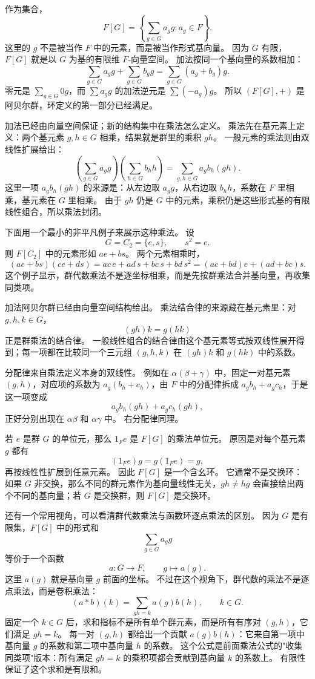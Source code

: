 作为集合，
\[
F[G]=\left\{\sum_{g\in G}a_g g:a_g\in F\right\}.
\]
这里的 $g$ 不是被当作 $F$ 中的元素，而是被当作形式基向量。
因为 $G$ 有限，$F[G]$ 就是以 $G$ 为基的有限维 $F$-向量空间。
加法按同一个基向量的系数相加：
\[
\sum_{g\in G}a_g g+\sum_{g\in G}b_g g
=\sum_{g\in G}(a_g+b_g)g.
\]
零元是 $\sum_{g\in G}0g$，而 $\sum a_g g$ 的加法逆元是 $\sum (-a_g)g$。
所以 $(F[G],+)$ 是阿贝尔群，环定义的第一部分已经满足。

加法已经由向量空间保证；新的结构集中在乘法怎么定义。
乘法先在基元素上定义：两个基元素 $g,h\in G$ 相乘，结果就是群里的乘积 $gh$。
一般元素的乘法则由双线性扩展给出：
\[
\left(\sum_{g\in G}a_g g\right)
\left(\sum_{h\in G}b_h h\right)
=
\sum_{g,h\in G}a_gb_h(gh).
\]
这里一项 $a_gb_h(gh)$ 的来源是：从左边取 $a_g g$，从右边取 $b_h h$，系数在 $F$ 里相乘，基元素在 $G$ 里相乘。
由于 $gh$ 仍是 $G$ 中的元素，乘积仍是这些形式基的有限线性组合，所以乘法封闭。

下面用一个最小的非平凡例子来展示这种乘法。
设
\[
G=C_2=\{e,s\},\qquad s^2=e.
\]
则 $F[C_2]$ 中的元素形如 $ae+bs$。
两个元素相乘时，
\[
(ae+bs)(ce+ds)
=ac\,e+ad\,s+bc\,s+bd\,s^2
=(ac+bd)e+(ad+bc)s.
\]
这个例子显示，群代数乘法不是逐坐标相乘，而是先按群乘法合并基向量，再收集同类项。

加法阿贝尔群已经由向量空间结构给出。
乘法结合律的来源藏在基元素里：对 $g,h,k\in G$，
\[
(gh)k=g(hk)
\]
正是群乘法的结合律。
一般线性组合的结合律由这个基元素等式按双线性展开得到；每一项都在比较同一个三元组 $(g,h,k)$ 在 $(gh)k$ 和 $g(hk)$ 中的系数。

分配律来自乘法定义本身的双线性。
例如在 $\alpha(\beta+\gamma)$ 中，固定一对基元素 $(g,h)$，对应项的系数为 $a_g(b_h+c_h)$，由 $F$ 中的分配律拆成 $a_gb_h+a_gc_h$，于是这一项变成
\[
a_gb_h(gh)+a_gc_h(gh),
\]
正好分别出现在 $\alpha\beta$ 和 $\alpha\gamma$ 中。
右分配律同理。

若 $e$ 是群 $G$ 的单位元，那么 $1_F e$ 是 $F[G]$ 的乘法单位元。
原因是对每个基元素 $g$ 都有
\[
(1_F e)g=g(1_F e)=g,
\]
再按线性性扩展到任意元素。
因此 $F[G]$ 是一个含幺环。
它通常不是交换环：如果 $G$ 非交换，那么不同的群元素作为基向量线性无关，$gh\neq hg$ 会直接给出两个不同的基向量；若 $G$ 是交换群，则 $F[G]$ 是交换环。

还有一个常用视角，可以看清群代数乘法与函数环逐点乘法的区别。
因为 $G$ 是有限集，$F[G]$ 中的形式和
\[
\sum_{g\in G}a_g g
\]
等价于一个函数
\[
a:G\to F,\qquad g\mapsto a(g).
\]
这里 $a(g)$ 就是基向量 $g$ 前面的坐标。
不过在这个视角下，群代数的乘法不是逐点乘法，而是卷积乘法：
\[
(a*b)(k)=\sum_{gh=k}a(g)b(h),\qquad k\in G.
\]
固定一个 $k\in G$ 后，求和指标不是所有单个群元素，而是所有有序对 $(g,h)$，它们满足 $gh=k$。
每一对 $(g,h)$ 都给出一个贡献 $a(g)b(h)$：它来自第一项中基向量 $g$ 的系数和第二项中基向量 $h$ 的系数。
这个公式是前面乘法公式的"收集同类项"版本：所有满足 $gh=k$ 的乘积项都会贡献到基向量 $k$ 的系数上。
有限性保证了这个求和是有限和。

